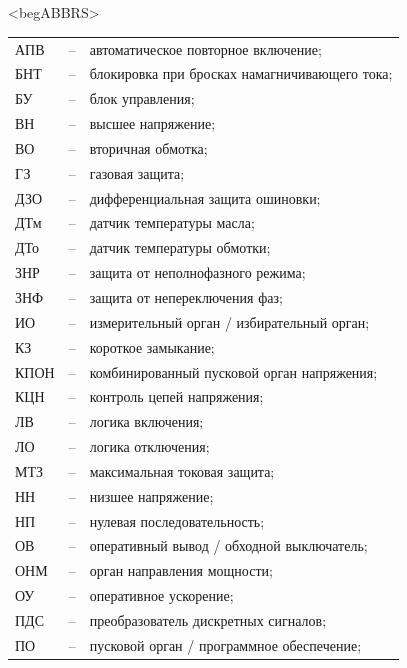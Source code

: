 \color{unidarkgreen}\section*{}
{\color{white}\fontsize{0.1pt}{0.1pt}\selectfont<begABBRS>}
\color{black}
\begin{longtable}{>{\raggedright\arraybackslash}m{2cm}>{\raggedright\arraybackslash}m{0.5cm}>{\raggedright\arraybackslash}m{20cm}}
\endfirsthead\endhead\endfoot\endlastfoot
АПВ & -- & автоматическое повторное включение; \\
БНТ & -- & блокировка при бросках намагничивающего тока; \\
БУ & -- & блок управления; \\
ВН & -- & высшее напряжение; \\
ВО & -- & вторичная обмотка; \\
ГЗ & -- & газовая защита; \\
ДЗО & -- & дифференциальная защита ошиновки; \\
ДТм & -- & датчик температуры масла; \\
ДТо & -- & датчик температуры обмотки; \\
ЗНР & -- & защита от неполнофазного режима; \\
ЗНФ & -- & защита от непереключения фаз; \\
ИО & -- & измерительный орган / избирательный орган; \\
КЗ & -- & короткое замыкание; \\
КПОН & -- & комбинированный пусковой орган напряжения; \\
КЦН & -- & контроль цепей напряжения; \\
ЛВ & -- & логика включения; \\
ЛО & -- & логика отключения; \\
МТЗ & -- & максимальная токовая защита; \\
НН & -- & низшее напряжение; \\
НП & -- & нулевая последовательность; \\
ОВ & -- & оперативный вывод / обходной выключатель; \\
ОНМ & -- & орган направления мощности; \\
ОУ & -- & оперативное ускорение; \\
ПДС & -- & преобразователь дискретных сигналов; \\
ПО & -- & пусковой орган / программное обеспечение; \\

\end{longtable}
